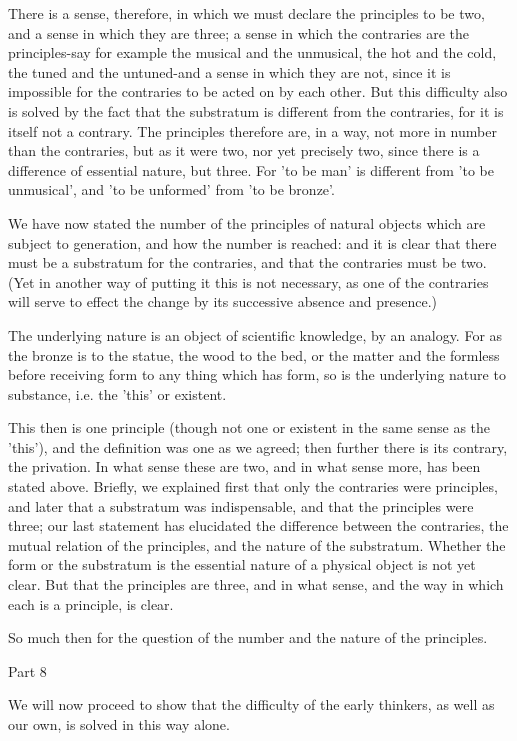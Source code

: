 There is a sense, therefore, in which we must declare the principles
to be two, and a sense in which they are three; a sense in which the
contraries are the principles-say for example the musical and the
unmusical, the hot and the cold, the tuned and the untuned-and a sense
in which they are not, since it is impossible for the contraries to
be acted on by each other. But this difficulty also is solved by the
fact that the substratum is different from the contraries, for it
is itself not a contrary. The principles therefore are, in a way,
not more in number than the contraries, but as it were two, nor yet
precisely two, since there is a difference of essential nature, but
three. For 'to be man' is different from 'to be unmusical', and 'to
be unformed' from 'to be bronze'. 

We have now stated the number of the principles of natural objects
which are subject to generation, and how the number is reached: and
it is clear that there must be a substratum for the contraries, and
that the contraries must be two. (Yet in another way of putting it
this is not necessary, as one of the contraries will serve to effect
the change by its successive absence and presence.) 

The underlying nature is an object of scientific knowledge, by an
analogy. For as the bronze is to the statue, the wood to the bed,
or the matter and the formless before receiving form to any thing
which has form, so is the underlying nature to substance, i.e. the
'this' or existent. 

This then is one principle (though not one or existent in the same
sense as the 'this'), and the definition was one as we agreed; then
further there is its contrary, the privation. In what sense these
are two, and in what sense more, has been stated above. Briefly, we
explained first that only the contraries were principles, and later
that a substratum was indispensable, and that the principles were
three; our last statement has elucidated the difference between the
contraries, the mutual relation of the principles, and the nature
of the substratum. Whether the form or the substratum is the essential
nature of a physical object is not yet clear. But that the principles
are three, and in what sense, and the way in which each is a principle,
is clear. 

So much then for the question of the number and the nature of the
principles. 

Part 8

We will now proceed to show that the difficulty of the early thinkers,
as well as our own, is solved in this way alone. 

